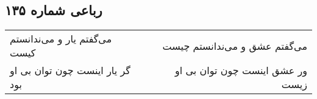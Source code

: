 \begin{center}
\section*{رباعی شماره ۱۳۵}
\label{sec:sh135}
\begin{longtable}{l p{0.5cm} r}
می‌گفتم یار و می‌ندانستم کیست
&&
می‌گفتم عشق و می‌ندانستم چیست
\\
گر یار اینست چون توان بی او بود
&&
ور عشق اینست چون توان بی او زیست
\\
\end{longtable}
\end{center}
